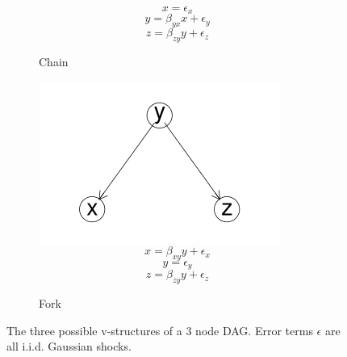 \documentclass{beamer}
\begin{document}
\begin{frame}
\begin{figure}
\begin{subfigure}{0.3\textwidth}
          \small
          \begin{equation*}
            x = \epsilon_{x}
          \end{equation*}
          \begin{equation*}
            y = \beta_{yx} x + \epsilon_{y}
          \end{equation*}
          \begin{equation*}
            z = \beta_{zy} y + \epsilon_{z}
          \end{equation*}
          \caption{Chain}
          \label{chain}
        \end{subfigure}
        \begin{subfigure}{0.3\textwidth}
          \includegraphics[width=\linewidth]{images/fork.png}
          \small
          \begin{equation*}
            x = \beta_{xy} y + \epsilon_{x}
          \end{equation*}
          \begin{equation*}
            y = \epsilon_{y}
          \end{equation*}
          \begin{equation*}
            z = \beta_{zy} y + \epsilon_{z}
          \end{equation*}
          \caption{Fork}
          \label{fork}
        \end{subfigure}
        \caption{The three possible v-structures of a 3 node DAG. Error terms $\epsilon$ are all i.i.d. Gaussian shocks.}
        \label{dag2}
      \end{figure}
\end{frame}
\end{document}

